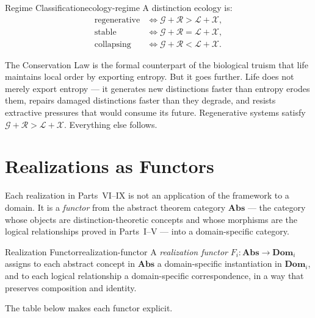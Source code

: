 \documentclass[12pt,twoside,openright]{book}
\begin{document}
\begin{corollary}{Regime Classification}{ecology-regime}
  A distinction ecology is:
  \begin{align*}
    \text{regenerative} &\iff
    \mathcal{G}+\mathcal{R} > \mathcal{L}+\mathcal{X}, \\
    \text{stable}       &\iff
    \mathcal{G}+\mathcal{R} = \mathcal{L}+\mathcal{X}, \\
    \text{collapsing}   &\iff
    \mathcal{G}+\mathcal{R} < \mathcal{L}+\mathcal{X}.
  \end{align*}
\end{corollary}

\noindent
The Conservation Law is the formal counterpart of the
biological truism that life maintains local order by
exporting entropy. But it goes further. Life does not
merely export entropy — it generates new distinctions
faster than entropy erodes them, repairs damaged
distinctions faster than they degrade, and resists
extractive pressures that would consume its future.
Regenerative systems satisfy $\mathcal{G} + \mathcal{R}
> \mathcal{L} + \mathcal{X}$. Everything else follows.

\section{Realizations as Functors}
\label{sec:ch30-functors}

Each realization in Parts~VI--IX is not an application
of the framework to a domain. It is a \emph{functor}
from the abstract theorem category $\mathbf{Abs}$ —
the category whose objects are distinction-theoretic
concepts and whose morphisms are the logical relationships
proved in Parts~I--V — into a domain-specific category.

\begin{definition}{Realization Functor}{realization-functor}
  A \emph{realization functor}
  $F_i : \mathbf{Abs} \to \mathbf{Dom}_i$
  assigns to each abstract concept in $\mathbf{Abs}$
  a domain-specific instantiation in $\mathbf{Dom}_i$,
  and to each logical relationship a domain-specific
  correspondence, in a way that preserves composition
  and identity.
\end{definition}

The table below makes each functor explicit.
\end{document}
